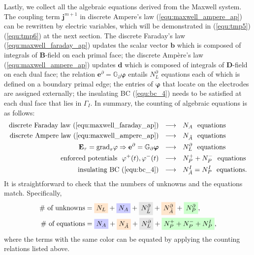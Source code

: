 \documentclass{report}
\begin{document}
Lastly, we collect all the algebraic equations derived from the Maxwell system. The coupling term $\mathbf{j}^{m+1}$ in discrete Ampere's law (\ref{equ:maxwell_ampere_ap}) can be rewritten by electric variables, which will be demonstrated in (\ref{equ:tmp5})(\ref{equ:tmp6}) at the next section. The discrete Faraday's law (\ref{equ:maxwell_faraday_ap}) updates the scalar vector $\mathbf{b}$ which is composed of integrals of $\mathbf{B}$-field on each primal face; the discrete Amp\`{e}re's law (\ref{equ:maxwell_ampere_ap}) updates $\mathbf{d}$ which is composed of integrals of $\mathbf{D}$-field on each dual face; the relation $\mathbf{e}^\partial = \mathbb{G}_\partial \bm{\varphi}$ entails $N^\partial_L$ equations each of which is defined on a boundary primal edge; the entries of $\bm{\varphi}$ that locate on the electrodes are assigned externally; the insulating BC (\ref{equ:bc_4}) needs to be satisfied at each dual face that lies in $\Gamma_I$. In summary, the counting of algebraic equations is as follows:
\begin{align*}
    \text{discrete Faraday law (\ref{equ:maxwell_faraday_ap})} \ \ &\longrightarrow\ \  N_A \ \ \text{equations} \\
    \text{discrete Ampere law (\ref{equ:maxwell_ampere_ap})} \ \ &\longrightarrow\ \  N_{\Tilde{A}} \ \ \text{equations} \\
     \mathbf{E}_\tau = \text{grad}_\tau \varphi \Rightarrow \mathbf{e}^\partial = \mathbb{G}_\partial \bm{\varphi} \ \ &\longrightarrow\ \  N^\partial_L \ \ \text{equations} \\
    \text{enforced potentials}\ \ \varphi^+(t), \varphi^-(t) \ \ &\longrightarrow\ \  N_P^+ + N_P^- \ \ \text{equations} \\
    \text{insulating BC (\ref{equ:bc_4})} \ \ &\longrightarrow\ \  N_{\Tilde{A}}^I = N_P^I \ \ \text{equations}.
\end{align*}
It is straightforward to check that the numbers of unknowns and the equations match. Specifically, 
\begin{align*}
    \#\text{ of unknowns} &= \colorbox{orange!20}{$N_L$} + \colorbox{blue!20}{$N_A$} + \colorbox{gray!20}{$N_{\Tilde{L}}^\partial$} + \colorbox{orange!20}{$N_{\Tilde{A}}^\partial$} + \colorbox{green!20}{$N_P^\partial$}, \\
    \#\text{ of equations} &= \colorbox{blue!20}{$N_A$} + \colorbox{orange!20}{$N_{\Tilde{A}}$} + \colorbox{gray!20}{$N_L^\partial$} + \colorbox{green!20}{$N_P^+ + N_P^- + N_P^I$},
\end{align*}
where the terms with the same color can be equated by applying the counting relations listed above.
\end{document}
